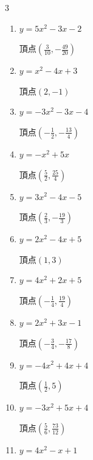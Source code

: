 \begin{multicols}{3}
\begin{enumerate}
        $\displaystyle 頂点\left( -\frac{1}{10} , \frac{81}{20} \right)$

  \item $\displaystyle y=5x^{2}-3x-2$

        $\displaystyle 頂点\left( \frac{3}{10} , -\frac{49}{20} \right)$

  \item $\displaystyle y=x^{2}-4x+3$

        $\displaystyle 頂点\left( 2 , -1 \right)$

  \item $\displaystyle y=-3x^{2}-3x-4$

        $\displaystyle 頂点\left( -\frac{1}{2} , -\frac{13}{4} \right)$

  \item $\displaystyle y=-x^{2}+5x$

        $\displaystyle 頂点\left( \frac{5}{2} , \frac{25}{4} \right)$

\columnbreak %

  \item $\displaystyle y=3x^{2}-4x-5$

        $\displaystyle 頂点\left( \frac{2}{3} , -\frac{19}{3} \right)$

  \item $\displaystyle y=2x^{2}-4x+5$

        $\displaystyle 頂点\left( 1 , 3 \right)$

  \item $\displaystyle y=4x^{2}+2x+5$

        $\displaystyle 頂点\left( -\frac{1}{4} , \frac{19}{4} \right)$

  \item $\displaystyle y=2x^{2}+3x-1$

        $\displaystyle 頂点\left( -\frac{3}{4} , -\frac{17}{8} \right)$

  \item $\displaystyle y=-4x^{2}+4x+4$

        $\displaystyle 頂点\left( \frac{1}{2} , 5 \right)$

\columnbreak %

\resetques

  \item $\displaystyle y=-3x^{2}+5x+4$

        $\displaystyle 頂点\left( \frac{5}{6} , \frac{73}{12} \right)$

  \item $\displaystyle y=4x^{2}-x+1$


\end{enumerate}
\end{multicols}
